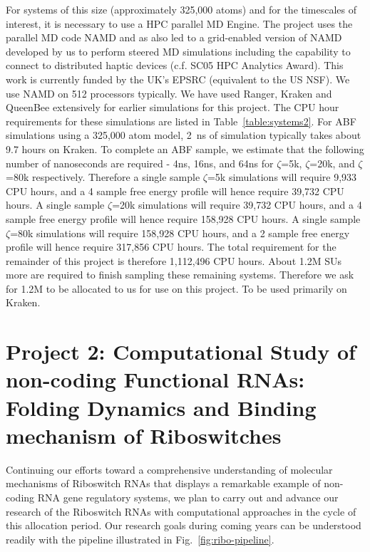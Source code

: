 \documentclass[a4paper,10pt]{article}
\begin{document}
For systems of this size (approximately 325,000 atoms) and for the timescales of interest, it is necessary to use a HPC parallel MD Engine.  The project uses the parallel MD code NAMD and as also led to a grid-enabled version of NAMD developed by us to perform steered MD simulations including the capability to connect to distributed haptic devices (c.f. SC05 HPC Analytics Award). This work is currently funded by the UK's EPSRC (equivalent to the US NSF).  We use NAMD on 512 processors typically. We have used Ranger, Kraken and QueenBee extensively for earlier simulations for this project. The CPU hour requirements for these simulations are listed in Table~\ref{table:systems2}. For ABF simulations using a 325,000 atom model, 2~ns of simulation typically takes about 9.7 hours on Kraken. To complete an ABF sample, we estimate that the following number of nanoseconds are required - 4ns, 16ns, and 64ns for $\zeta$=5k, $\zeta$=20k, and $\zeta$=80k respectively. Therefore a single sample $\zeta$=5k simulations will require 9,933 CPU hours, and a 4 sample free energy profile will hence require 39,732 CPU hours. A single sample $\zeta$=20k simulations will require 39,732 CPU hours, and a 4 sample free energy profile will hence require 158,928 CPU hours. A single sample $\zeta$=80k simulations will require 158,928 CPU hours, and a 2 sample free energy profile will hence require 317,856 CPU hours. The total requirement for the remainder of this project is therefore 1,112,496 CPU hours. About 1.2M SUs more are required to finish sampling these remaining systems.  Therefore we ask for 1.2M to be allocated to us for use on this project. To be used primarily on Kraken.

\section*{Project 2: Computational Study of non-coding Functional RNAs: Folding Dynamics and Binding mechanism of Riboswitches}

Continuing our efforts toward a comprehensive understanding of molecular mechanisms of Riboswitch RNAs that displays a remarkable example of non-coding RNA gene regulatory systems, we plan to carry out and advance our research of the Riboswitch RNAs with computational approaches in the cycle of this allocation period.  Our research goals during coming years can be understood readily with the pipeline illustrated in Fig.~\ref{fig:ribo-pipeline}. 
\end{document}
